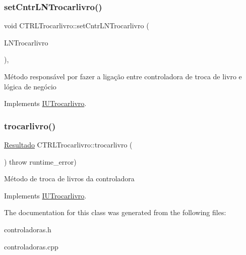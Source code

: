 \subsubsection{\texorpdfstring{set\+Cntr\+L\+N\+Trocarlivro()}{setCntrLNTrocarlivro()}}
{\footnotesize\ttfamily void C\+T\+R\+L\+Trocarlivro\+::set\+Cntr\+L\+N\+Trocarlivro (\begin{DoxyParamCaption}\item[{\hyperlink{classILNTrocarlivro}{I\+L\+N\+Trocarlivro} $\ast$}]{L\+N\+Trocarlivro }\end{DoxyParamCaption})\hspace{0.3cm}{\ttfamily [inline]}, {\ttfamily [virtual]}}

Método responsável por fazer a ligação entre controladora de troca de livro e lógica de negócio 

Implements \hyperlink{classIUTrocarlivro}{I\+U\+Trocarlivro}.

\mbox{\label{classCTRLTrocarlivro_ab0bd103af757427e4272e44dfbe47a49}} 
\subsubsection{\texorpdfstring{trocarlivro()}{trocarlivro()}}
{\footnotesize\ttfamily \hyperlink{classResultado}{Resultado} C\+T\+R\+L\+Trocarlivro\+::trocarlivro (\begin{DoxyParamCaption}{ }\end{DoxyParamCaption}) throw  runtime\+\_\+error) \hspace{0.3cm}{\ttfamily [virtual]}}

Método de troca de livros da controladora 

Implements \hyperlink{classIUTrocarlivro}{I\+U\+Trocarlivro}.



The documentation for this class was generated from the following files\+:\begin{DoxyCompactItemize}
\item 
controladoras.\+h\item 
controladoras.\+cpp\end{DoxyCompactItemize}
